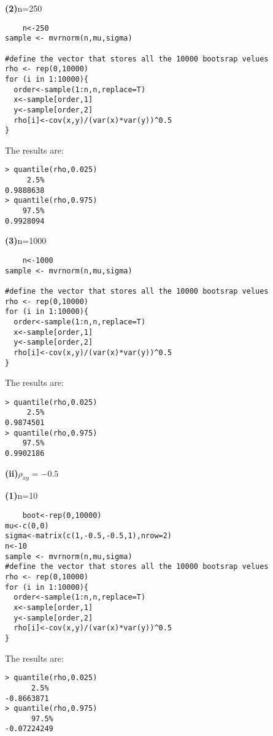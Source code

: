 \documentclass[letterpaper,11pt]{article}
\begin{document}
\begin{addmargin}[0em]{0em} \textbf{(2)}n=250\par \end{addmargin}
\begin{lstlisting}
	n<-250
sample <- mvrnorm(n,mu,sigma)

#define the vector that stores all the 10000 bootsrap velues
rho <- rep(0,10000)
for (i in 1:10000){
  order<-sample(1:n,n,replace=T)
  x<-sample[order,1]
  y<-sample[order,2]
  rho[i]<-cov(x,y)/(var(x)*var(y))^0.5
}
\end{lstlisting}
The results are:
\begin{lstlisting}
> quantile(rho,0.025)
     2.5% 
0.9888638 
> quantile(rho,0.975)
    97.5% 
0.9928094 
\end{lstlisting}

\begin{addmargin}[0em]{0em} \textbf{(3)}n=1000\par \end{addmargin}
\begin{lstlisting}
	n<-1000
sample <- mvrnorm(n,mu,sigma)

#define the vector that stores all the 10000 bootsrap velues
rho <- rep(0,10000)
for (i in 1:10000){
  order<-sample(1:n,n,replace=T)
  x<-sample[order,1]
  y<-sample[order,2]
  rho[i]<-cov(x,y)/(var(x)*var(y))^0.5
}
\end{lstlisting}
The results are:
\begin{lstlisting}
> quantile(rho,0.025)
     2.5% 
0.9874501 
> quantile(rho,0.975)
    97.5% 
0.9902186 
\end{lstlisting}





\begin{addmargin}[-1.1em]{0em} \textbf{(ii)}$\rho_{xy}=-0.5$\par \end{addmargin}


\begin{addmargin}[0em]{0em} \textbf{(1)}n=10\par \end{addmargin}
\begin{lstlisting}
	boot<-rep(0,10000)
mu<-c(0,0)
sigma<-matrix(c(1,-0.5,-0.5,1),nrow=2)
n<-10
sample <- mvrnorm(n,mu,sigma)
#define the vector that stores all the 10000 bootsrap velues
rho <- rep(0,10000)
for (i in 1:10000){
  order<-sample(1:n,n,replace=T)
  x<-sample[order,1]
  y<-sample[order,2]
  rho[i]<-cov(x,y)/(var(x)*var(y))^0.5
}
\end{lstlisting}
The results are:
\begin{lstlisting}
> quantile(rho,0.025)
      2.5% 
-0.8663871 
> quantile(rho,0.975)
      97.5% 
-0.07224249 
\end{lstlisting}
\end{document}
